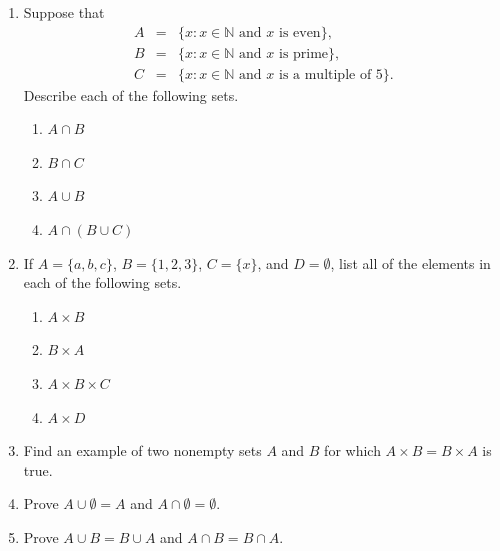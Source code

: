 {\small
\begin{enumerate}


\item
Suppose that
\begin{eqnarray*}
A & = & \{ x : \mbox{$x \in {\mathbb N}$ and $x$ is even} \}, \\
B & = & \{x : \mbox{$x \in {\mathbb N}$ and $x$ is prime}\}, \\
C & = & \{ x : \mbox{$x \in {\mathbb N}$ and $x$ is a multiple of $5$}\}.
\end{eqnarray*}
Describe each of the following sets. 
\begin{multicols}{2}
\begin{enumerate}

\item
$A \cap B$

\item
$B \cap C$

\item
$A \cup B$

\item
$A \cap (B \cup C)$

\end{enumerate}
\end{multicols}
 
\item
If $A = \{ a, b, c \}$, $B = \{ 1, 2, 3 \}$, $C = \{ x \}$, and $D = \emptyset$, list all of the elements in each of the following sets. 
\begin{multicols}{2}
\begin{enumerate}

\item
$A \times B$

\item
$B \times A$

\item
$A \times B \times C$

\item
$A \times D$

\end{enumerate}
\end{multicols}
  
\item
Find an example of two nonempty sets $A$ and $B$ for which $A \times B = B \times A$ is true. 
 
\item
Prove $A \cup \emptyset = A$ and $A \cap \emptyset = \emptyset$.
 
\item
Prove $A \cup B = B \cup A$ and $A \cap B = B \cap A$.
 

\end{enumerate}}
